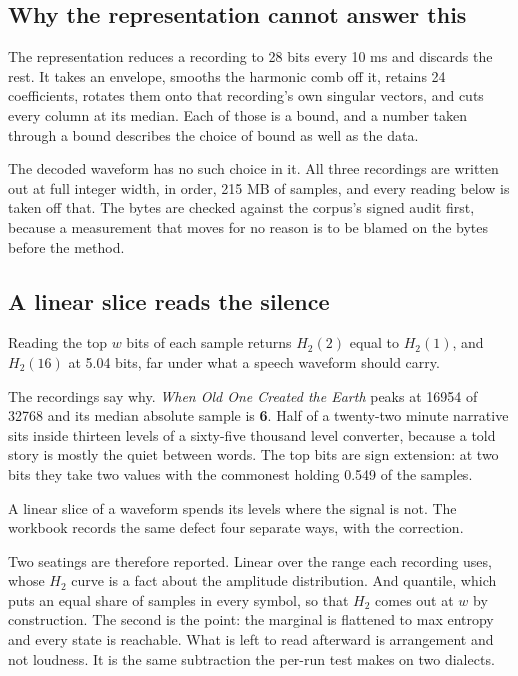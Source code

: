 \subsection{Why the representation cannot answer this}

The representation reduces a recording to 28 bits every 10 ms and discards the rest. It takes an
envelope, smooths the harmonic comb off it, retains 24 coefficients, rotates them onto that
recording's own singular vectors, and cuts every column at its median. Each of those is a bound, and
a number taken through a bound describes the choice of bound as well as the data.

The decoded waveform has no such choice in it. All three recordings are written out at full integer
width, in order, 215 MB of samples, and every reading below is taken off that. The bytes are checked
against the corpus's signed audit first, because a measurement that moves for no reason is to be
blamed on the bytes before the method.

\subsection{A linear slice reads the silence}

Reading the top \(w\) bits of each sample returns \(H_2(2)\) equal to \(H_2(1)\), and \(H_2(16)\) at
5.04 bits, far under what a speech waveform should carry.

The recordings say why. \emph{When Old One Created the Earth} peaks at 16954 of 32768 and its median
absolute sample is \textbf{6}. Half of a twenty-two minute narrative sits inside thirteen levels of a
sixty-five thousand level converter, because a told story is mostly the quiet between words. The top
bits are sign extension: at two bits they take two values with the commonest holding 0.549 of the
samples.

A linear slice of a waveform spends its levels where the signal is not. The workbook records the
same defect four separate ways, with the correction.

Two seatings are therefore reported. Linear over the range each recording uses, whose \(H_2\) curve
is a fact about the amplitude distribution. And quantile, which puts an equal share of samples in
every symbol, so that \(H_2\) comes out at \(w\) by construction. The second is the point: the
marginal is flattened to max entropy and every state is reachable. What is left to read
afterward is arrangement and not loudness. It is the same subtraction the per-run test makes on two
dialects.


